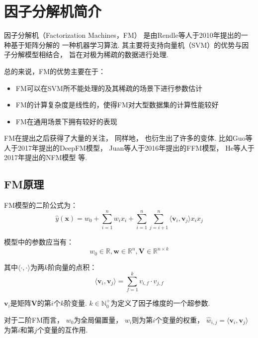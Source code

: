 \section{因子分解机简介}

因子分解机（Factorization Machines，FM）
是由Rendle等人于2010年提出的一种基于矩阵分解的
一种机器学习算法.
其主要将支持向量机（SVM）的优势与因子分解模型相结合，
旨在对极为稀疏的数据进行处理.

总的来说，FM的优势主要在于\cite{rendleFactorizationMachines2010}：
\begin{itemize}
    \item FM可以在SVM所不能处理的及其稀疏的场景下进行参数估计
    \item FM的计算复杂度是线性的，使得FM对大型数据集的计算性能较好
    \item FM在通用场景下拥有较好的表现
\end{itemize}

FM在提出之后获得了大量的关注，
同样地，
也衍生出了许多的变体.
比如Guo等人于2017年提出的DeepFM模型\cite{guoDeepFMFactorizationMachineBased2017}，
Juan等人于2016年提出的FFM模型\cite{juanFieldawareFactorizationMachines2016}，
He等人于2017年提出的NFM模型\cite{heNeuralFactorizationMachines2017}
等.

\subsection{FM原理}

FM模型的二阶公式为：
\begin{equation}
    \hat{y}(\mathbf{x})=w_0+\sum_{i=1}^n w_i x_i+\sum_{i=1}^n\sum_{j=i+1}^n\langle\mathbf{v}_i,\mathbf{v}_j\rangle x_i x_j
\end{equation}

模型中的参数应当有：
\begin{equation}
    w_0\in\mathbb{R}, \mathbf{w}\in\mathbb{R}^n, \mathbf{V}\in\mathbb{R}^{n\times k}
\end{equation}

其中$\langle\cdot,\cdot\rangle$为两$k$阶向量的点积：
\begin{equation}
    \langle\mathbf{v}_i,\mathbf{v}_j\rangle=\sum_{f=1}^k v_{i,f}\cdot v_{j,f}
\end{equation}

$\mathbf{v}_i$是矩阵$\mathbf{V}$的第$i$个$k$阶变量.
$k\in\mathbb{N}_0^+$为定义了因子维度的一个超参数.

对于二阶FM而言，
$w_0$为全局偏置量，
$w_i$则为第$i$个变量的权重，
$\hat{w}_{i,j}=\langle\mathbf{v}_i,\mathbf{v}_j\rangle$
为第$i$和第$j$个变量的互作用.

